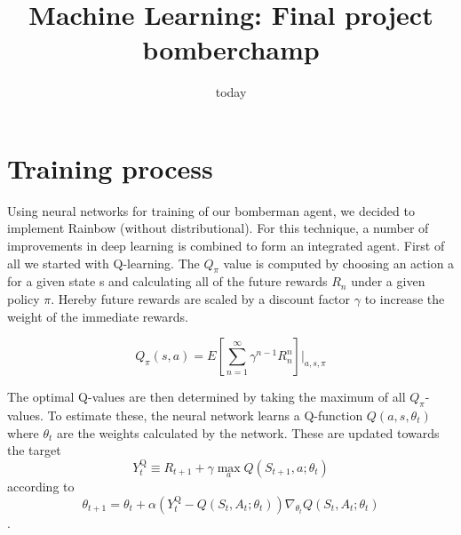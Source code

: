 \documentclass[12pt]{article}
\title{Machine Learning: Final project bomberchamp}
\date{today}
\begin{document}
\section{Training process}
Using neural networks for training of our bomberman agent, we decided to implement Rainbow (without distributional). For this technique, a number of improvements in deep learning is combined to form an integrated agent. First of all we started with Q-learning.
The $Q_\pi$ value is computed by choosing an action a for a given state s and calculating all of the future rewards $R_n$ under a given policy $\pi$.
Hereby future rewards are scaled by a discount factor $\gamma$ to increase the weight of the immediate rewards.

\begin{equation}
Q_\pi(s,a)= E\left[\sum_{n=1}^{\infty} \gamma^{n-1}R_n^n\right] \Bigg|_{a,s,\pi}
\end{equation}

The optimal Q-values are then determined by taking the maximum of all $Q_\pi$-values.
To estimate these, the neural network learns a Q-function $Q(a, s, \theta_t)$ where $\theta_t$ are the weights calculated by the network.
These are updated towards the target
\begin{equation} 
Y_{t}^{\mathrm{Q}} \equiv R_{t+1}+\gamma \max _{a} Q\left(S_{t+1}, a ; \theta_{t}\right)
 \end{equation}
 according to
\begin{equation}
\theta_{t+1}=\theta_{t}+\alpha\left(Y_{t}^{\mathrm{Q}}-Q\left(S_{t}, A_{t} ; \theta_{t}\right)\right) \nabla_{\theta_{t}} Q\left(S_{t}, A_{t} ; \theta_{t}\right)
\end{equation}.
\end{document}
